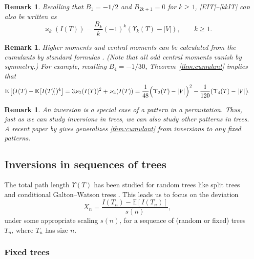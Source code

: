 \documentclass[11pt]{article}
\newcommand{\E}[1]{\mathbb{E} \left[#1\right]}
\def\U{\Upsilon}
\numberwithin{theorem}{section}
\newtheorem{remark}[theorem]{Remark}
\theoremstyle{definition}
\numberwithin{equation}{section}
\newcommand{\refT}[1]{Theorem~\ref{#1}}
\newcommand\kk{\varkappa}
\newcommand\xpar[1]{(#1)}
\newcommand\Bigpar[1]{\Bigl(#1\Bigr)}
\begin{document}
\begin{remark}\label{R1}
    Recalling that \(B_{1}=-1/2\) and \(B_{2k+1}=0\) for \(k \ge 1\), 
\eqref{EIT}--\eqref{kkIT} %
can also be written
    as
    \[
        \kk_{k}(I(T)) = \frac{B_k}{k}(-1)^{k}(\Upsilon_{k}(T)-|V|),
        \qquad
        k \ge 1
        .
    \]
\end{remark}

\begin{remark}
Higher moments and central moments 
can be calculated from the cumulants by standard formulas \cite{s95}.
(Note that all odd central moments vanish by symmetry.)
For example,  recalling $B_4=-1/30$, \refT{thm:cumulant} implies that
\begin{equation}
\E {\xpar{I(T)-\E{I(T)}}^4} 
= 
3\kk_2(I(T))^2 
+
\kk_4(I(T))
= 
\frac{1}{48} \Bigpar{
    \U_{2}(T)-|V|
}^2
-\frac{1}{120}
(
\U_{4}(T)-|V|
).
\end{equation}
\end{remark}

\begin{remark}
    An inversion is a special case of a pattern in a permutation. Thus, just as we can study
    inversions in trees, we can also study other patterns in trees. A recent paper by
    \citet{finoa2018} gives generalizes \ref{thm:cumulant} from inversions to any fixed patterns.
\end{remark}

\subsection{Inversions in sequences of trees}

The total path length $\U(T)$ has been studied for
random trees like split trees \cite{MR3025680} and conditional Galton--Watson trees \cite[Corollary
9]{a91}.  This leads us to focus on the deviation
$$
X_n 
=
\frac{I(T_n) - \E{I(T_n)}}{s(n)}
,
$$
under some appropriate scaling $s(n)$, for a sequence of (random or fixed)
trees $T_n$, where $T_n$ has size \(n\).

\subsubsection*{Fixed trees}
\end{document}

